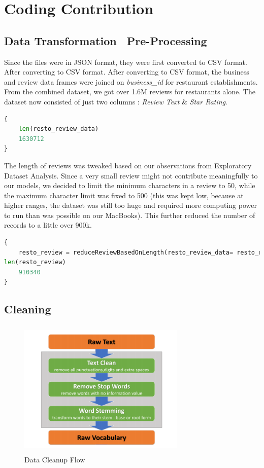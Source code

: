 \documentclass[paper=a4, fontsize=11pt]{scrartcl} %
\numberwithin{equation}{section} %
\numberwithin{figure}{section} %
\numberwithin{table}{section} %
\begin{document}
\section{Coding Contribution}
\subsection{Data Transformation \ Pre-Processing}
Since the files were in JSON format, they were first converted to CSV format. After converting to CSV format. After converting to CSV format, the business and review data frames were joined on \textit{business\_id} for restaurant establishments. From the combined dataset, we got over 1.6M reviews for restaurants alone. The dataset now consisted of just two columns : \textit{Review Text} \& \textit{Star Rating}. \\
\begin{lstlisting}[language=python]
{
  	len(resto_review_data)
  	1630712
}
\end{lstlisting}
The length of reviews was tweaked based on our observations from Exploratory Dataset Analysis. Since a very small review might not contribute meaningfully to our models, we decided to limit the minimum characters in a review to 50, while the maximum character limit was fixed to 500 (this was kept low, because at higher ranges, the dataset was still too huge and required more computing power to run than was possible on our MacBooks).
This further reduced the number of records to a little over 900k. \\
\begin{lstlisting}[language=python]
{
  	resto_review = reduceReviewBasedOnLength(resto_review_data= resto_review_data, minReviewLen=50, maxReviewLen=500)
len(resto_review)
  	910340
}
\end{lstlisting}
\subsection{Cleaning}

\begin{figure}
\centering
\includegraphics[width=300px, height = 250px]{DataPreprocessFlow.png}
\caption{Data Cleanup Flow}
\label{cleanup_diag}
\end{figure} 
\end{document}
